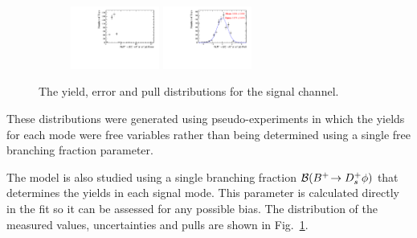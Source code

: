\begin{figure}[!h]
\begin{subfigure}[t]{1.0\textwidth}
      \includegraphics[width=0.32\textwidth]{figs/B2DsPhi/Plots_DsKK_Error_yield_peak_total_DsPhi_Ds2KPiPi_toy_both_DsBDTbin1_PhiBDTbin1_both_both.pdf}
      \includegraphics[width=0.32\textwidth]{figs/B2DsPhi/Plots_DsKK_Pull_yield_peak_total_DsPhi_Ds2KPiPi_toy_both_DsBDTbin1_PhiBDTbin1_both_both.pdf}
      \caption{\decay{\Dsp}{\Kp\pim\pip}}
   \end{subfigure}

   \caption{The yield, error and pull distributions for the signal channel.}
   \label{fig:B2DsPhi_Pulls_signal}
\end{figure}

These distributions were generated using pseudo-experiments in which the yields for each \Dsp mode were free variables rather than being determined using a single free branching fraction parameter.

The model is also studied using a single branching fraction ${\mathcal{B}}({{{B}^+}}\!\rightarrow {\ensuremath{{D}^+_{s}}}\phi)$ that determines the yields in each signal mode. This parameter is calculated directly in the fit so it can be assessed for any possible bias. The distribution of the measured values, uncertainties and pulls are shown in Fig.~\ref{fig:B2DsPhi_Pulls_signal}.


